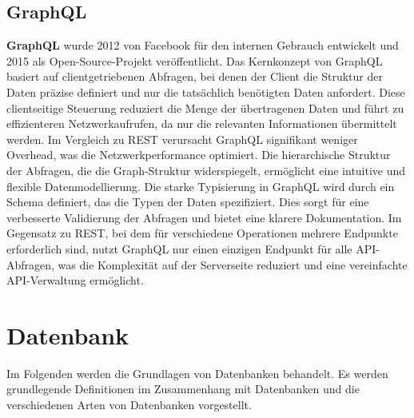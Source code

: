 \subsection{GraphQL} %
\label{sec:graphql}
\textbf{GraphQL} wurde 2012 von Facebook für den internen Gebrauch entwickelt und 2015 als Open-Source-Projekt veröffentlicht. Das Kernkonzept von GraphQL basiert auf clientgetriebenen Abfragen, bei denen der Client die Struktur der Daten präzise definiert und nur die tatsächlich benötigten Daten anfordert. Diese clientseitige Steuerung reduziert die Menge der übertragenen Daten und führt zu effizienteren Netzwerkaufrufen, da nur die relevanten Informationen übermittelt werden. 
Im Vergleich zu REST verursacht GraphQL signifikant weniger Overhead, was die Netzwerkperformance optimiert. Die hierarchische Struktur der Abfragen, die die Graph-Struktur widerspiegelt, ermöglicht eine intuitive und flexible Datenmodellierung. Die starke Typisierung in GraphQL wird durch ein Schema definiert, das die Typen der Daten spezifiziert. Dies sorgt für eine verbesserte Validierung der Abfragen und bietet eine klarere Dokumentation. Im Gegensatz zu REST, bei dem für verschiedene Operationen mehrere Endpunkte erforderlich sind, nutzt GraphQL nur einen einzigen Endpunkt für alle API-Abfragen, was die Komplexität auf der Serverseite reduziert und eine vereinfachte API-Verwaltung ermöglicht. \citep{graphqlreplacerest}

\section{Datenbank} %
\label{sec:datenbankGrundlagen}
Im Folgenden werden die Grundlagen von Datenbanken behandelt. Es werden grundlegende Definitionen im Zusammenhang mit Datenbanken und die verschiedenen Arten von Datenbanken vorgestellt.
